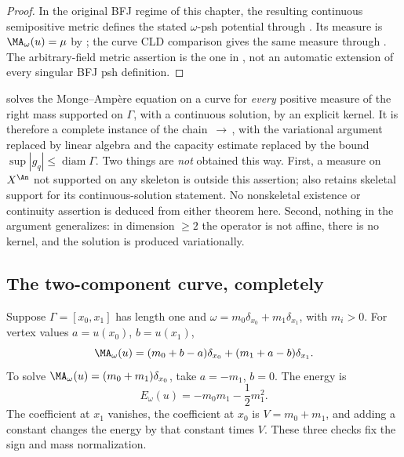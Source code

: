 \begin{proof}
In the original BFJ regime of this chapter, the resulting continuous
semipositive metric defines the stated $\omega$-psh potential through
.  Its measure is
$\MA_\omega(u)=\mu$ by ; the
curve CLD comparison gives the same measure through
.
The arbitrary-field metric assertion is the one in
, not an automatic extension
of every singular BFJ psh definition.
\end{proof}

\begin{remark}
\label{rem:ch31-curve-solution-scope}
 solves the Monge--Amp\`ere equation on a
curve for \emph{every} positive measure of the right mass supported on
\(\Gamma\), with a continuous solution, by an explicit kernel.  It is
therefore a complete instance of the chain
\,\(\to\)\,,
with the variational argument replaced by linear algebra and the capacity
estimate replaced by the bound \(\sup|g_q|\leq\operatorname{diam}\Gamma\).
Two things are \emph{not} obtained this way.  First, a measure on
\(X^{\An}\) not supported on any skeleton is outside this assertion;
 also retains skeletal support
for its continuous-solution statement.  No nonskeletal existence or
continuity assertion is deduced from either theorem here.
Second, nothing in the argument generalizes: in dimension
\(\geq2\) the operator is not affine, there is no kernel, and the solution
is produced variationally.
\end{remark}

\subsection{The two-component curve, completely}
\label{sec:ch31-two-component}

\begin{example}
\label{ex:two-component-complete}
Suppose \(\Gamma=[x_0,x_1]\) has length one and
\(\omega=m_0\delta_{x_0}+m_1\delta_{x_1}\), with \(m_i>0\).  For vertex
values \(a=u(x_0)\), \(b=u(x_1)\),
\begin{equation}
 \MA_\omega(u)
 =(m_0+b-a)\delta_{x_0}+(m_1+a-b)\delta_{x_1}.
\label{eq:two-component-ma}
\end{equation}
To solve \(\MA_\omega(u)=(m_0+m_1)\delta_{x_0}\), take
\(a=-m_1\), \(b=0\).  The energy is
\begin{equation}
 E_\omega(u)
 =-m_0m_1-\frac12m_1^2.
\label{eq:two-component-energy}
\end{equation}
The coefficient at \(x_1\) vanishes, the coefficient at \(x_0\) is
\(V=m_0+m_1\), and adding a constant changes the energy by that constant
times \(V\).  These three checks fix the sign and mass normalization.
\end{example}

